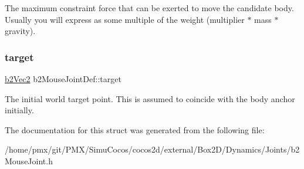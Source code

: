 The maximum constraint force that can be exerted to move the candidate body. Usually you will express as some multiple of the weight (multiplier $\ast$ mass $\ast$ gravity). \mbox{\label{structb2MouseJointDef_aa1b76f72df9aca8d42bdc3e9922e310a}} 
\subsubsection{\texorpdfstring{target}{target}}
{\footnotesize\ttfamily \hyperlink{structb2Vec2}{b2\+Vec2} b2\+Mouse\+Joint\+Def\+::target}

The initial world target point. This is assumed to coincide with the body anchor initially. 

The documentation for this struct was generated from the following file\+:\begin{DoxyCompactItemize}
\item 
/home/pmx/git/\+P\+M\+X/\+Simu\+Cocos/cocos2d/external/\+Box2\+D/\+Dynamics/\+Joints/b2\+Mouse\+Joint.\+h\end{DoxyCompactItemize}
